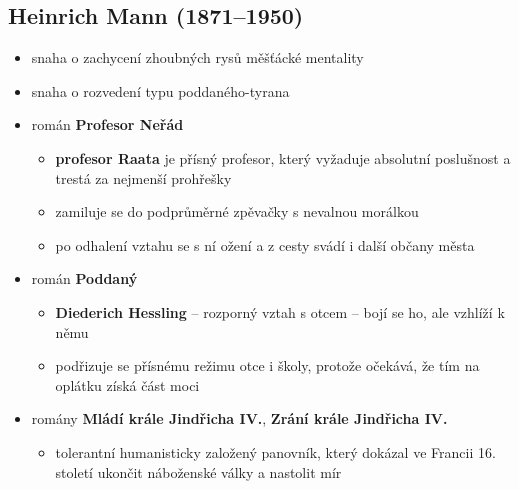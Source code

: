 \subsection{Heinrich Mann (1871--1950)}
\begin{itemize}
\item snaha o zachycení zhoubných rysů měšťácké mentality
\item snaha o rozvedení typu poddaného-tyrana
\item román \textbf{Profesor Neřád}
	\begin{itemize}
	\item \textbf{profesor Raata} je přísný profesor, který vyžaduje absolutní poslušnost a trestá za nejmenší prohřešky
	\item zamiluje se do podprůměrné zpěvačky s nevalnou morálkou
	\item po odhalení vztahu se s ní ožení a z cesty svádí i další občany města
	\end{itemize}
\item román \textbf{Poddaný}
	\begin{itemize}
	\item \textbf{Diederich Hessling} -- rozporný vztah s otcem -- bojí se ho, ale vzhlíží k němu
	\item podřizuje se přísnému režimu otce i školy, protože očekává, že tím na oplátku získá část moci
	\end{itemize}
\item romány \textbf{Mládí krále Jindřicha IV.}, \textbf{Zrání krále Jindřicha IV.}
	\begin{itemize}
	\item tolerantní humanisticky založený panovník, který dokázal ve Francii 16. století ukončit náboženské války a nastolit mír
	\end{itemize}
\end{itemize}

